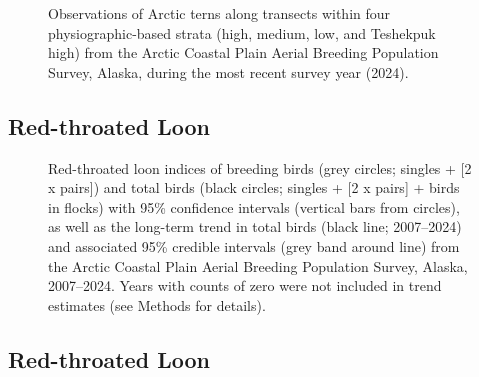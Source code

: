 \documentclass[
]{article}
\begin{document}
\begin{figure}


\caption{\label{fig-ARTEmap}Observations of Arctic terns along transects
within four physiographic-based strata (high, medium, low, and Teshekpuk
high) from the Arctic Coastal Plain Aerial Breeding Population Survey,
Alaska, during the most recent survey year (2024).}

\end{figure}%

\newpage{}

\subsection*{Red-throated Loon}\label{red-throated-loon}

\begin{figure}


\caption{\label{fig-RTLO}Red-throated loon indices of breeding birds
(grey circles; singles + {[}2 x pairs{]}) and total birds (black
circles; singles + {[}2 x pairs{]} + birds in flocks) with 95\%
confidence intervals (vertical bars from circles), as well as the
long-term trend in total birds (black line; 2007--2024) and associated
95\% credible intervals (grey band around line) from the Arctic Coastal
Plain Aerial Breeding Population Survey, Alaska, 2007--2024. Years with
counts of zero were not included in trend estimates (see Methods for
details).}

\end{figure}%

\newpage{}

\subsection*{Red-throated Loon}\label{red-throated-loon-1}

\begingroup\fontsize{10}{12}\selectfont
\end{document}

